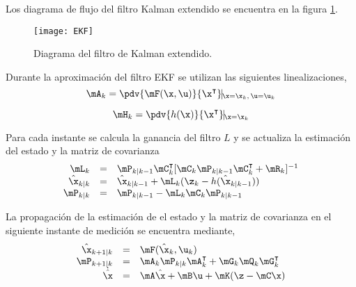 Los diagrama de flujo del filtro Kalman extendido se encuentra en la figura \ref{EKF}. 
\begin{figure}[h!]
	\centering
	\texttt{[image: EKF]}
	\caption{Diagrama del filtro de Kalman extendido.}
	\label{EKF}
\end{figure}
%
Durante la aproximación del filtro EKF se utilizan las siguientes linealizaciones,
\begin{equation}
	\mA_k=\pdv{\mF(\x,\u)}{\x^\intercal} \vline_{\x=\x_k,\,\u=\u_k}
\end{equation}

\begin{equation}
	\mH_k=\pdv{h(\x)}{\x^\intercal} \vline_{\x=\x_k}
\end{equation}

Para cada instante se calcula la ganancia del filtro $L$ y se actualiza la estimación del estado y la matriz de covarianza
\begin{equation}
\begin{array}{rcl}
\mL_k&=&\mP_{k|k-1} \mC_k^\intercal [\mC_k \mP_{k|k-1}\mC_k^\intercal + \mR_k]^{-1}\\
\hat{\x}_{k|k}&=&\hat{\x}_{k|k-1} + \mL_k (\z_k-h(\hat{\x}_{k|k-1}))\\
\mP_{k|k}&=&\mP_{k|k-1} - \mL_k \mC_k \mP_{k|k-1}
\end{array}
\end{equation}

La propagación de la estimación de el estado y la matriz de covarianza en el siguiente instante de medición se encuentra mediante,
\begin{equation}
\begin{array}{rcl}
\hat{\x}_{k+1|k}&=&\mF(\hat{\x}_k,\u_k)\\
\mP_{k+1|k}&=&\mA_k \mP_{k|k} \mA_k^\intercal + \mG_k \mQ_k \mG_k^\intercal\\
\dot{\hat{\x}}&=&\mA\hat{\x}+\mB\u+\mK(\z-\mC\x)
\end{array}
\end{equation}

